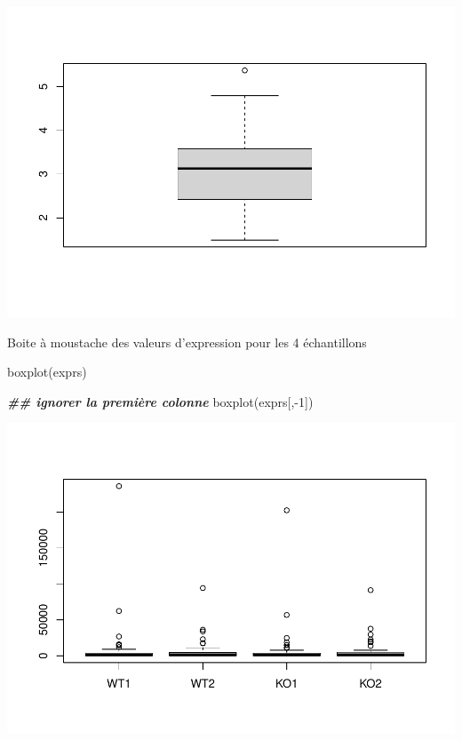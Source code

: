 \documentclass[
]{book}
\newenvironment{Shaded}{\begin{snugshade}}{\end{snugshade}}
\newcommand{\DecValTok}[1]{\textcolor[rgb]{0.00,0.00,0.81}{#1}}
\newcommand{\DocumentationTok}[1]{\textcolor[rgb]{0.56,0.35,0.01}{\textbf{\textit{#1}}}}
\newcommand{\FunctionTok}[1]{\textcolor[rgb]{0.00,0.00,0.00}{#1}}
\newcommand{\NormalTok}[1]{#1}
\newcommand{\SpecialCharTok}[1]{\textcolor[rgb]{0.00,0.00,0.00}{#1}}
\begin{document}
\begin{Shaded}
\end{Shaded}

\includegraphics{images/unnamed-chunk-80-1.pdf}

Boite à moustache des valeurs d'expression pour les 4 échantillons

\begin{Shaded}
\begin{Highlighting}[]
\FunctionTok{boxplot}\NormalTok{(exprs)}
\end{Highlighting}
\end{Shaded}

\begin{Shaded}
\begin{Highlighting}[]
\DocumentationTok{\#\# ignorer la première colonne}
\FunctionTok{boxplot}\NormalTok{(exprs[,}\SpecialCharTok{{-}}\DecValTok{1}\NormalTok{])     }
\end{Highlighting}
\end{Shaded}

\includegraphics{images/unnamed-chunk-81-1.pdf}
\end{document}
